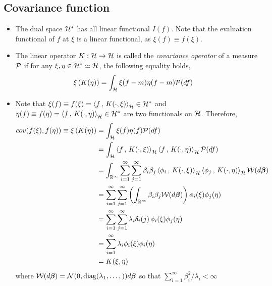 \documentclass[11pt]{article}
\begin{document}
\subsection{Covariance function}
\begin{itemize}
\item The dual space ${\mathcal H}^{*}$ has all linear functional $I(f)$. Note that the evaluation functional of $f$ at $\xi$ is a linear functional, as $\xi(f) \equiv f(\xi)$.\\

\item The linear operator  $K: {\mathcal H} \rightarrow {\mathcal H}$ is called the \emph{covariance operator} of a measure ${\mathcal P}$ if  for any $\xi, \eta \in {\mathcal H}^{*} \simeq {\mathcal H} $,  the following equality holds,
\begin{align}
\xi\left( K(\eta ) \right) &= \int_{{\mathcal H}}\xi(f-m)\eta(f-m){\mathcal P}(df) \nonumber
\end{align} 
\vspace{15pt}
\item Note that $\xi(f) \equiv f(\xi)= \left\langle f\,,\, K(\cdot, \xi) \right\rangle_{{\mathcal H}}\in {\mathcal H}^{*}$ and $\eta(f)\equiv f(\eta)= \left\langle f\,,\, K(\cdot, \eta) \right\rangle_{{\mathcal H}} \in {\mathcal H}^{*}$ are two functionals on ${\mathcal H}$. Therefore,
\begin{align*}
cov(f(\xi), f(\eta))\equiv \xi\left( K(\eta ) \right) &= \int_{{\mathcal H}}\xi(f)\eta(f){\mathcal P}(df) \nonumber\\
&=  \int_{{\mathcal H}}\left\langle f\,,\, K(\cdot, \xi) \right\rangle_{{\mathcal H}}\left\langle f\,,\, K(\cdot, \eta) \right\rangle_{{\mathcal H}}{\mathcal P}(df)\\
&= \int_{{\mathbb R}^{\infty}}\sum_{i=1}^{\infty} \sum_{j=1}^{\infty} \beta_{i}\beta_{j}\left\langle \phi_{i}\,,\, K(\cdot, \xi) \right\rangle_{{\mathcal H}}\left\langle \phi_{j}\,,\, K(\cdot, \eta) \right\rangle_{{\mathcal H}} {\mathcal W}(d\boldsymbol{\beta})\\
&=\sum_{i=1}^{\infty} \sum_{j=1}^{\infty} \left(  \int_{{\mathbb R}^{\infty}}\beta_{i}\beta_{j}{\mathcal W}(d\boldsymbol{\beta})\right)\phi_{i}(\xi)\phi_{j}(\eta)\\
&= \sum_{i=1}^{\infty} \sum_{j=1}^{\infty}\lambda_{i}\delta_{i}(j)\,\phi_{i}(\xi)\phi_{j}(\eta)\\
&= \sum_{i=1}^{\infty}\lambda_{i}\phi_{i}(\xi)\phi_{i}(\eta)\\
&= K(\xi, \eta)
\end{align*} where ${\mathcal W}(d\boldsymbol{\beta})= {\mathcal N}(0,\text{diag}(\lambda_{1},\ldots, ))d\boldsymbol{\beta}$ so that $\sum_{i=1}^{\infty}\beta_{i}^{2}/\lambda_{i}<\infty$



\end{itemize}
\end{document}
